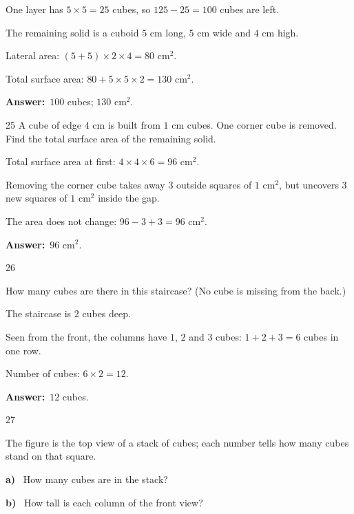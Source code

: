 \documentclass[11pt]{article}
\newif\ifsol \solfalse
\providecommand{\AnsWord}{Đáp số}
\newcommand{\dapso}[1]{\par\textbf{\AnsWord:}\ #1}
\newcommand{\probsol}[1]{%
  \begin{lrbox}{\solmeasure}\begin{minipage}{\dimexpr\linewidth-24pt\relax}#1\end{minipage}\end{lrbox}%
  \ifsol
    \begin{solbox}#1\end{solbox}%
  \else
    \setlength{\solht}{\dimexpr\ht\solmeasure+\dp\solmeasure+0.85cm\relax}%
    \ifdim\solht<1.35cm\setlength{\solht}{1.35cm}\fi
    \begin{tcolorbox}[colback=white,colframe=Line,boxrule=0.8pt,arc=5pt,
      left=8pt,right=8pt,top=4pt,bottom=4pt,height=\solht]{\footnotesize\color{Slate}\itshape\WorkWord}\end{tcolorbox}%
  \fi}
\newcommand{\pa}[1]{\textbf{#1)}\ }
\newcommand{\gap}{\vspace{0.3cm}}
\def\WorkWord{Your work:}
\def\AnsWord{Answer}
\begin{document}
\probsol{
One layer has $5\times5=25$ cubes, so $125-25=100$ cubes are left.\par
The remaining solid is a cuboid $5$ cm long, $5$ cm wide and $4$ cm high.\par
Lateral area: $(5+5)\times2\times4=80$ cm$^2$.\par
Total surface area: $80+5\times5\times2=130$ cm$^2$.
\dapso{$100$ cubes; $130$ cm$^2$.}}
\gap
\begin{probbox}{25}{\relax}
A cube of edge $4$ cm is built from $1$ cm cubes. One corner cube is removed. Find the total surface area of the remaining solid.
\end{probbox}
\probsol{
Total surface area at first: $4\times4\times6=96$ cm$^2$.\par
Removing the corner cube takes away $3$ outside squares of $1$ cm$^2$, but uncovers $3$ new squares of $1$ cm$^2$ inside the gap.\par
The area does not change: $96-3+3=96$ cm$^2$.
\dapso{$96$ cm$^2$.}}
\gap
\begin{probbox}{26}{\relax}
\begin{minipage}[t]{0.6\linewidth}
How many cubes are there in this staircase? (No cube is missing from the back.)
\end{minipage}\hfill
\begin{minipage}[t]{0.36\linewidth}\vspace{0pt}\centering
{}
\end{minipage}
\end{probbox}
\probsol{
The staircase is $2$ cubes deep.\par
Seen from the front, the columns have $1$, $2$ and $3$ cubes: $1+2+3=6$ cubes in one row.\par
Number of cubes: $6\times2=12$.
\dapso{$12$ cubes.}}
\gap
\begin{probbox}{27}{\relax}
\begin{minipage}[t]{0.6\linewidth}
The figure is the top view of a stack of cubes; each number tells how many cubes stand on that square.\par
\pa{a} How many cubes are in the stack?\par
\pa{b} How tall is each column of the front view?
\end{minipage}\hfill
\begin{minipage}[t]{0.36\linewidth}\vspace{0pt}\centering
{}
\end{minipage}
\end{probbox}
\end{document}
